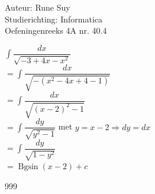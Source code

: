 \documentclass[a4paper]{article}
\newcommand{\Bgsin}{\operatorname{Bgsin}}
\newcommand{\Int}{\displaystyle\int}
\begin{document}
  
\noindent \large Auteur: Rune Suy \\
\noindent \large Studierichting: Informatica\\
\noindent \large Oefeningenreeks 4A nr. 40.4\\

\medskip

\normalsize

$\Int \dfrac{dx}{\sqrt{-3+4x-x^2}}$\\

$=\Int \dfrac{dx}{\sqrt{-(x^2-4x+4-1)}}$\\

$=\Int \dfrac{dx}{\sqrt{(x-2)^2-1}}$\\

$=\Int \dfrac{dy}{\sqrt{y^2-1}}$ met $y=x-2 \Rightarrow dy=dx$\\

$=\Int \dfrac{dy}{\sqrt{1-y^2}}$\\

$= \Bgsin(x-2) + c$\\

\begin{thebibliography}{999}
\end{thebibliography}
\end{document}
